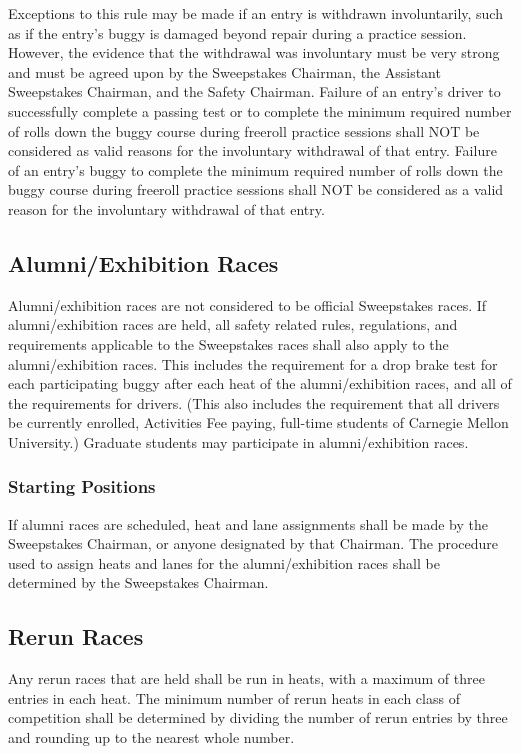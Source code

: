 	Exceptions to this rule may be made if an entry is withdrawn involuntarily,
	such as if the entry's buggy is damaged beyond repair during a practice
	session. However, the evidence that the withdrawal was involuntary must be very
	strong and must be agreed upon by the Sweepstakes Chairman, the Assistant
	Sweepstakes Chairman, and the Safety Chairman. Failure of an entry's driver to
	successfully complete a passing test or to complete the minimum required number
	of rolls down the buggy course during freeroll practice sessions shall NOT be
	considered as valid reasons for the involuntary withdrawal of that entry.
	Failure of an entry's buggy to complete the minimum required number of rolls
	down the buggy course during freeroll practice sessions shall NOT be considered
	as a valid reason for the involuntary withdrawal of that entry.

\subsection{Alumni/Exhibition Races}

	Alumni/exhibition races are not considered to be official Sweepstakes races. If
	alumni/exhibition races are held, all safety related rules, regulations, and
	requirements applicable to the Sweepstakes races shall also apply to the
	alumni/exhibition races. This includes the requirement for a drop brake test
	for each participating buggy after each heat of the alumni/exhibition races,
	and all of the requirements for drivers. (This also includes the requirement
	that all drivers be currently enrolled, Activities Fee paying, full-time
	students of Carnegie Mellon University.) Graduate students may participate in
	alumni/exhibition races.

\subsubsection{Starting Positions}

	If alumni races are scheduled, heat and lane assignments shall be made by the
	Sweepstakes Chairman, or anyone designated by that Chairman. The procedure used
	to assign heats and lanes for the alumni/exhibition races shall be determined
	by the Sweepstakes Chairman.

\subsection{Rerun Races}
	
	Any rerun races that are held shall be run in heats, with a maximum of three
	entries in each heat. The minimum number of rerun heats in each class of
	competition shall be determined by dividing the number of rerun entries by
	three and rounding up to the nearest whole number.

